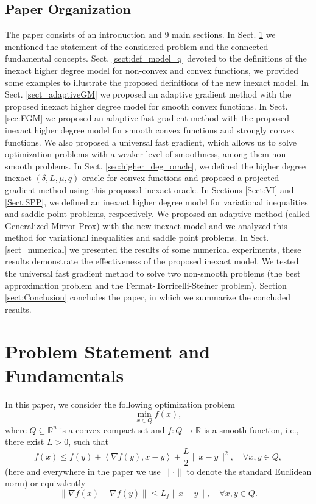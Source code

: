 \documentclass[11pt]{amsart}
\theoremstyle{definition}
\numberwithin{equation}{section}
\begin{document}
\subsection{Paper Organization}
The paper consists of an introduction and 9 main sections.  In Sect. \ref{sect_basics} we mentioned the statement of the considered problem and the connected fundamental concepts.  Sect. \ref{sect:def_model_q} devoted to the definitions of the inexact higher degree model for non-convex and convex functions, we provided some examples to illustrate the proposed definitions of the new inexact model. In Sect. \ref{sect_adaptiveGM} we proposed an adaptive gradient method with the proposed inexact higher degree model for smooth convex functions.  In Sect.  \ref{sec:FGM} we proposed an adaptive fast gradient method with the proposed inexact higher degree model for smooth convex functions and strongly convex functions. We also proposed a universal fast gradient, which allows us to solve optimization problems with a weaker level of smoothness, among them non-smooth problems. In Sect. \ref{sec:higher_deg_oracle}, we defined the higher degree inexact $(\delta, L, \mu, q)$-oracle for convex functions and proposed a projected gradient method using this proposed inexact oracle. In Sections \ref{Sect:VI} and \ref{Sect:SPP}, we defined an inexact higher degree model for variational inequalities and saddle point problems, respectively. We proposed an adaptive method (called Generalized Mirror Prox) with the new inexact model and we analyzed this method for variational inequalities and saddle point problems. In Sect. \ref{sect_numerical} we presented the results of some numerical experiments, these results demonstrate the effectiveness of the proposed inexact model. We tested the universal fast gradient method to solve two non-smooth problems (the best approximation problem and the Fermat-Torricelli-Steiner problem). Section \ref{sect:Conclusion} concludes the paper, in which we summarize the concluded results.   

\section{Problem Statement and Fundamentals }\label{sect_basics}

In this paper, we consider the following optimization problem
\begin{equation}\label{main_min_prob}
    \min_{x \in Q} f(x),
\end{equation}
where $Q \subseteq \mathbb{R}^n$ is a convex compact set and  $f: Q \longrightarrow \mathbb{R}$ is a smooth function, i.e., there exist $L>  0$, such that  
\begin{equation}\label{smoothness_cond}
    f(x) \leq f(y)+ \left\langle\nabla f(y), x - y\right\rangle + \frac{L}{2} \|x - y\|^2, \quad \forall x, y \in Q,
\end{equation}
(here and everywhere in the paper we use $\|\cdot\|$ to denote the standard Euclidean norm) or equivalently 
\begin{equation}\label{smoothness_cond2}
    \|\nabla f(x) - \nabla f(y)\| \leq L_f \|x - y\|, \quad \forall x, y \in Q.
\end{equation}
\end{document}
